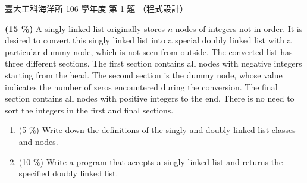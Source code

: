 \begin{pastexam}[label={px:ntu-106-esoe-ds-01}]{臺大工科海洋所 106 學年度 第 1 題}
（程式設計）

\textbf{(15 \%)} A singly linked list originally stores $n$ nodes of integers not in order. It is
desired to convert this singly linked list into a special doubly linked list with a particular
dummy node, which is not seen from outside. The converted list has three different sections. The
first section contains all nodes with negative integers starting from the head. The second
section is the dummy node, whose value indicates the number of zeros encountered during the
conversion. The final section contains all nodes with positive integers to the end. There is no
need to sort the integers in the first and final sections.
\begin{enumerate}[label=\alph*.]
\item (5 \%) Write down the definitions of the singly and doubly linked list classes and nodes.
\item (10 \%) Write a program that accepts a singly linked list and returns the specified doubly
linked list.
\end{enumerate}
\end{pastexam}

